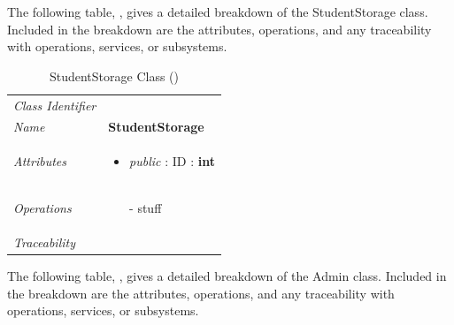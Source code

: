 \documentclass[12pt,letterpaper]{article}
\begin{document}
The following table, , gives a detailed breakdown of the StudentStorage class. Included in the breakdown are the attributes, operations, and any traceability with operations, services, or subsystems.

\begin{table}[H]
    \caption{StudentStorage Class ()} 
	\begin{tabu} to 
		\toprule
		Class Identifier &  \\
		Name & {\bf StudentStorage} \\
		Attributes & 
		\begin{minipage}[t]{\linewidth}
		    \begin{itemize}
		        \item \textit{public} : ID : \bf{int}
			\end{itemize}
	    \end{minipage} \\

		Operations &
		\begin{minipage}[t]{\linewidth}
			\begin{enumerate}
			    \item[-] stuff
	        \end{enumerate}
	    \end{minipage} \\
	    	Traceability & \\
		\toprule
	\end{tabu}
\end{table}

The following table, , gives a detailed breakdown of the Admin class. Included in the breakdown are the attributes, operations, and any traceability with operations, services, or subsystems.
\end{document}
